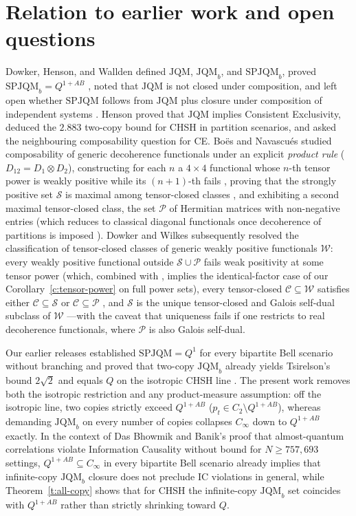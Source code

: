 \documentclass[11pt,a4paper]{article}
\theoremstyle{definition}
\theoremstyle{remark}
\newcommand{\JQM}{\mathrm{JQM}}
\newcommand{\JQMb}{\mathrm{JQM}_b}
\newcommand{\SPJQMb}{\mathrm{SPJQM}_b}
\newcommand{\QAB}{Q^{1+AB}}
\begin{document}
\section{Relation to earlier work and open questions}\label{s:earlier}

Dowker, Henson, and Wallden \cite{DHW} defined $\JQM$, $\JQMb$, and $\SPJQMb$, proved $\SPJQMb = \QAB$ \cite[Theorem~21]{DHW}, noted that $\JQM$ is not closed under composition, and left open whether $\mathrm{SPJQM}$ follows from $\JQM$ plus closure under composition of independent systems \cite[Sec.~4]{DHW}. Henson \cite{Henson} proved that $\JQM$ implies Consistent Exclusivity, deduced the $2.883$ two-copy bound for CHSH in partition scenarios, and asked the neighbouring composability question for CE. Bo\"es and Navascu\'es \cite{BN} studied composability of generic decoherence functionals under an explicit \emph{product rule} ($D_{12} = D_1 \otimes D_2$), constructing for each $n$ a $4 \times 4$ functional whose $n$-th tensor power is weakly positive while its $(n+1)$-th fails \cite[Lemma~2]{BN}, proving that the strongly positive set $\mathcal{S}$ is maximal among tensor-closed classes \cite[Lemma~3]{BN}, and exhibiting a second maximal tensor-closed class, the set $\mathcal{P}$ of Hermitian matrices with non-negative entries (which reduces to classical diagonal functionals once decoherence of partitions is imposed \cite[Sec.~3]{BN}). Dowker and Wilkes \cite{DW} subsequently resolved the classification of tensor-closed classes of generic weakly positive functionals $\mathcal{W}$: every weakly positive functional outside $\mathcal{S} \cup \mathcal{P}$ fails weak positivity at some tensor power \cite[Lemma~12]{DW} (which, combined with \cite[Theorem~21]{DHW}, implies the identical-factor case of our Corollary~\ref{c:tensor-power} on full power sets), every tensor-closed $\mathcal{C} \subseteq \mathcal{W}$ satisfies either $\mathcal{C} \subseteq \mathcal{S}$ or $\mathcal{C} \subseteq \mathcal{P}$ \cite[Theorem~4]{DW}, and $\mathcal{S}$ is the unique tensor-closed and Galois self-dual subclass of $\mathcal{W}$ \cite[Theorem~3]{DW}---with the caveat \cite[Sec.~5]{DW} that uniqueness fails if one restricts to real decoherence functionals, where $\mathcal{P}$ is also Galois self-dual.

Our earlier releases established $\mathrm{SPJQM} = Q^1$ for every bipartite Bell scenario without branching \cite{SPJQM} and proved that two-copy $\JQMb$ already yields Tsirelson's bound $2\sqrt{2}$ and equals $Q$ on the isotropic CHSH line \cite{TwoCopy}. The present work removes both the isotropic restriction and any product-measure assumption: off the isotropic line, two copies strictly exceed $\QAB$ ($p_t \in C_2 \setminus \QAB$), whereas demanding $\JQMb$ on every number of copies collapses $C_\infty$ down to $\QAB$ exactly. In the context of Das Bhowmik and Banik's proof \cite{DBB} that almost-quantum correlations violate Information Causality without bound for $N \ge 757{,}693$ settings, $\QAB \subseteq C_\infty$ in every bipartite Bell scenario already implies that infinite-copy $\JQMb$ closure does not preclude IC violations in general, while Theorem~\ref{t:all-copy} shows that for CHSH the infinite-copy $\JQMb$ set coincides with $\QAB$ rather than strictly shrinking toward $Q$.
\end{document}
